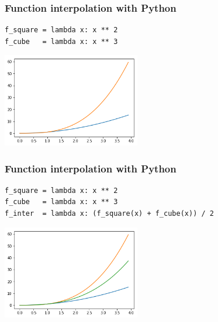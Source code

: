 \documentclass[9pt]{beamer}
\begin{document}
\begin{frame}[fragile]
  \frametitle{Function interpolation with Python}

  \begin{lstlisting}
f_square = lambda x: x ** 2
f_cube   = lambda x: x ** 3
  \end{lstlisting}

  \begin{center}
    \includegraphics[width = 6cm]{images/two_functions.png}
  \end{center}

\end{frame}

\begin{frame}[fragile]
  \frametitle{Function interpolation with Python}

  \begin{lstlisting}
f_square = lambda x: x ** 2
f_cube   = lambda x: x ** 3
f_inter  = lambda x: (f_square(x) + f_cube(x)) / 2
  \end{lstlisting}

  \begin{center}
    \includegraphics[width = 6cm]{images/single_interpolation.png}
  \end{center}

\end{frame}
\end{document}
